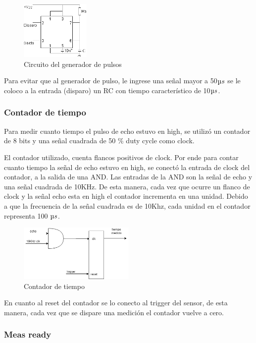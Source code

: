 \documentclass[../../e3_tp2_main.tex]{subfiles}
\begin{document}
\begin{figure}[H]	
	\centering
	\includegraphics[width=0.3\textwidth]{imagenes/555C.png}
	\caption{Circuito del generador de pulsos}\label{fig:555c}
\end{figure}
Para evitar que al generador de pulso, le ingrese una señal mayor a 50$\micro s$ se le coloco a la entrada (disparo) un RC con tiempo característico de 10$\micro s$. 

\subsubsection{Contador de tiempo}
Para medir cuanto tiempo el pulso de echo estuvo en high, se utilizó un contador de 8 bits y una señal cuadrada de 50 \% duty cycle como clock.
\par El contador utilizado, cuenta flancos positivos de clock. Por ende para contar cuanto tiempo la señal de echo estuvo en high, se conectó la entrada de clock del contador, a la salida de una AND. Las entradas de la AND son la señal de echo y una señal cuadrada de 10KHz. De esta manera, cada vez que ocurre un flanco de clock y la señal echo esta en high el contador incrementa en una unidad. Debido a que la frecuencia de la señal cuadrada es de 10Khz, cada unidad en el contador representa 100 $\micro s$.
\begin{figure}[H]	
	\centering
	\includegraphics[width=0.5\textwidth]{imagenes/contador.png}
	\caption{Contador de tiempo}
\end{figure}
\par En cuanto al reset del contador se lo conecto al trigger del sensor, de esta manera, cada vez que se dispare una medición el contador vuelve a cero.
\subsubsection{Meas ready}
\end{document}
